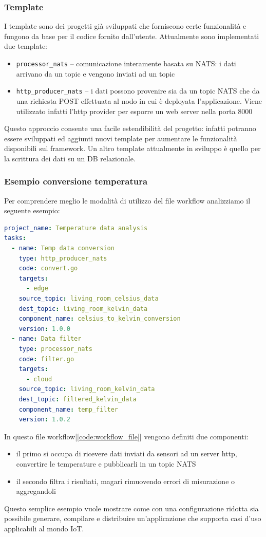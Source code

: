 \subsubsection{Template}

I template sono dei progetti già sviluppati che forniscono certe funzionalità e fungono da base per il codice fornito dall'utente. Attualmente sono implementati due template:
\begin{itemize}
    \item \texttt{processor\_nats} -- comunicazione interamente basata su NATS: i dati arrivano da un topic e vengono inviati ad un topic
    \item \texttt{http\_producer\_nats} -- i dati possono provenire sia da un topic NATS che da una richiesta POST effettuata al nodo in cui è deployata l'applicazione. Viene utilizzato infatti l'http provider per esporre un web server nella porta 8000
\end{itemize}

Questo approccio consente una facile estendibilità del progetto: infatti potranno essere sviluppati ed aggiunti nuovi template per aumentare le funzionalità disponibili sul framework. Un altro template attualmente in sviluppo è quello per la scrittura dei dati su un DB relazionale.

\subsubsection{Esempio conversione temperatura}

Per comprendere meglio le modalità di utilizzo del file workflow analizziamo il seguente esempio:

\begin{lstlisting}[language=yaml, caption={Esempio Workflow file con processor e producer}, captionpos=b, label={code:workflow_file}, keepspaces=true]
project_name: Temperature data analysis
tasks:
  - name: Temp data conversion
    type: http_producer_nats
    code: convert.go
    targets:
      - edge
    source_topic: living_room_celsius_data
    dest_topic: living_room_kelvin_data
    component_name: celsius_to_kelvin_conversion
    version: 1.0.0
  - name: Data filter
    type: processor_nats
    code: filter.go
    targets:
      - cloud
    source_topic: living_room_kelvin_data
    dest_topic: filtered_kelvin_data
    component_name: temp_filter
    version: 1.0.2
\end{lstlisting}

In questo file workflow[\ref{code:workflow_file}] vengono definiti due componenti:
\begin{itemize}
    \item il primo si occupa di ricevere dati inviati da sensori ad un server http, convertire le temperature e pubblicarli in un topic NATS
    \item il secondo filtra i risultati, magari rimuovendo errori di misurazione o aggregandoli
\end{itemize}
Questo semplice esempio vuole mostrare come con una configurazione ridotta sia possibile generare, compilare e distribuire un'applicazione che supporta casi d'uso applicabili al mondo IoT.

